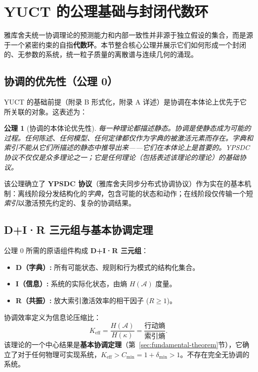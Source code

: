 \documentclass[11pt,a4paper]{article}
\newtheorem{axiom}{公理}
\begin{document}
	
	\section{YUCT 的公理基础与封闭代数环}
	\label{sec:axiomatic-foundations}
	
	雅库舍夫统一协调理论的预测能力和内部一致性并非源于独立假设的集合，而是源于一个紧密约束的自指\textbf{代数环}。本节整合核心公理并展示它们如何形成一个封闭的、无参数的系统，统一粒子质量的离散谱与连续几何的涌现。
	
	\subsection{协调的优先性（公理 0）}
	\label{subsec:axiom0}
	
	YUCT 的基础前提（附录 B 形式化，附录 A 详述）是协调在本体论上优先于它所关联的对象。这表述为：
	
	\begin{axiom}[协调的本体论优先性]
		每一种理论都描述静态。协调是使静态成为可能的过程。任何陈述、任何模型、任何定律都仅作为字典的被激活元素而存在。字典和索引不能从它们所描述的静态中推导出来——它们在本体论上是首要的。YPSDC 协议不仅仅是众多理论之一；它是任何理论（包括表述该理论的理论）的基础协议。
	\end{axiom}
	
	该公理确立了 \textbf{YPSDC 协议}（雅库舍夫同步分布式协调协议）作为实在的基本机制：离线阶段分发结构化的\textit{字典}，包含可能的状态和动作；在线阶段仅传输一个短\textit{索引}以激活预先约定的、复杂的协调结果。
	
	\subsection{D+I·R 三元组与基本协调定理}
	\label{subsec:dir-triad}
	
	公理 0 所需的原语组件构成 \textbf{D+I·R 三元组}：
	\begin{itemize}
		\item \textbf{D（字典）:} 所有可能状态、规则和行为模式的结构化集合。
		\item \textbf{I（信息）:} 系统的实际化状态，由熵 $H(\mathcal{A})$ 度量。
		\item \textbf{R（共振）:} 放大索引激活效率的相干因子 ($R \geq 1$)。
	\end{itemize}
	协调效率定义为信息论压缩比：
	\[
	K_{\mathrm{eff}} = \frac{H(\mathcal{A})}{H(\kappa)} = \frac{\text{行动熵}}{\text{索引熵}}.
	\]
	该理论的一个中心结果是\textbf{基本协调定理}（第~\ref{sec:fundamental-theorem}节），它确立了对于任何物理可实现系统，$K_{\mathrm{eff}} > C_{\min} = 1 + \delta_{\min} > 1$。不存在完全无协调的系统。
	
\end{document}
